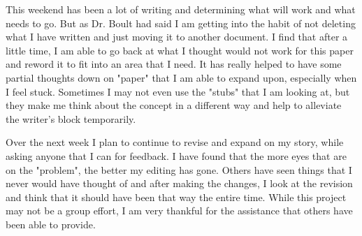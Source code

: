 \documentclass{IEEEtran}
\begin{document}
This weekend has been a lot of writing and determining what will work and what needs to go. But as Dr. Boult had 
said I am getting into the habit of not deleting what I have written and just moving it to another document. I 
find that after a little time, I am able to go back at what I thought would not work for this paper and reword it
to fit into an area that I need. It has really helped to have some partial thoughts down on "paper" that I am 
able to expand upon, especially when I feel stuck. Sometimes I may not even use the "stubs" that I am looking at,
but they make me think about the concept in a different way and help to alleviate the writer's block temporarily.

Over the next week I plan to continue to revise and expand on my story, while asking anyone that I can for 
feedback. I have found that the more eyes that are on the "problem", the better my editing has gone. Others have 
seen things that I never would have thought of and after making the changes, I look at the revision and think 
that it should have been that way the entire time. While this project may not be a group effort, I am very 
thankful for the assistance that others have been able to provide. 
\end{document}
